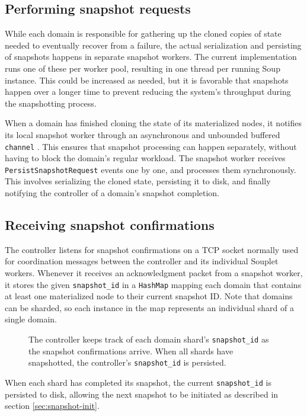 \documentclass[b5paper]{report}
\begin{document}
\subsection{Performing snapshot requests}
While each domain is responsible for gathering up the cloned copies of state
needed to eventually recover from a failure, the actual serialization and
persisting of snapshots happens in separate snapshot workers. The current
implementation runs one of these per worker pool, resulting in one thread
per running Soup instance. This could be increased as needed, but it is
favorable that snapshots happen over a longer time to prevent reducing the
system's throughput during the snapshotting process.

When a domain has finished cloning the state of its materialized nodes, it
notifies its local snapshot worker through an asynchronous and unbounded
buffered \texttt{channel} \cite{rust-channels}. This ensures that snapshot
processing can happen separately, without having to block the domain's regular
workload. The snapshot worker receives \texttt{PersistSnapshotRequest} events
one by one, and processes them synchronously. This involves serializing the
cloned state, persisting it to disk, and finally notifying the controller of a
domain's snapshot completion.

\subsection{Receiving snapshot confirmations}
The controller listens for snapshot confirmations on a TCP socket normally used
for coordination messages between the controller and its individual Souplet
workers. Whenever it receives an acknowledgment packet from a snapshot worker,
it stores the given \texttt{snapshot\_id} in a \texttt{HashMap} mapping each
domain that contains at least one materialized node to their current snapshot
ID. Note that domains can be sharded, so each instance in the map represents an
individual shard of a single domain.

\begin{figure}[H]
  
  \caption{
    The controller keeps track of each domain shard's \texttt{snapshot\_id} as
    the snapshot confirmations arrive. When all shards have snapshotted, the
    controller's \texttt{snapshot\_id} is persisted.
    \label{fig:snapshot-id}
  }
\end{figure}

When each shard has completed its snapshot, the current \texttt{snapshot\_id} is
persisted to disk, allowing the next snapshot to be initiated as described in
section \ref{sec:snapshot-init}.
\end{document}
